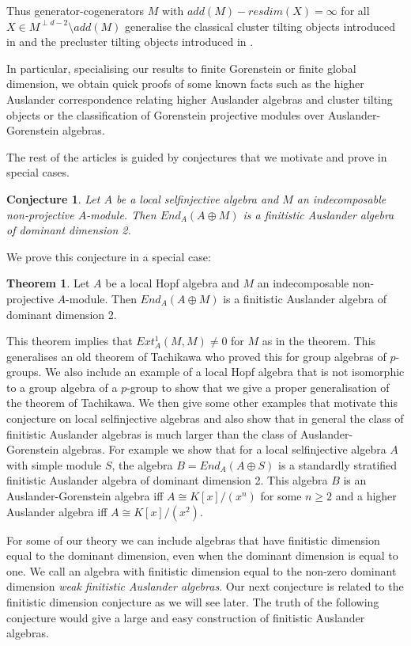 \documentclass[a4paper]{amsart}
\newtheorem*{conjecture}{Conjecture}
\theoremstyle{definition}
\newtheorem*{theorem*}{Theorem}
\theoremstyle{remark}
\numberwithin{equation}{theorem}
\begin{document}
Thus generator-cogenerators $M$ with $add(M)-resdim(X)= \infty$ for all $X \in M^{\perp d-2} \setminus add(M)$ generalise the classical cluster tilting objects introduced in \cite{Iya} and the precluster tilting objects introduced in \cite{IyaSol}.

In particular, specialising our results to finite Gorenstein or finite global dimension, we obtain quick proofs of some known facts such as the higher Auslander correspondence relating higher Auslander algebras and cluster tilting objects or the classification of Gorenstein projective modules over Auslander-Gorenstein algebras.

The rest of the articles is guided by conjectures that we motivate and prove in special cases.

\begin{conjecture} 
Let $A$ be a local selfinjective algebra and $M$ an indecomposable non-projective $A$-module.
Then $End_A(A \oplus M)$ is a finitistic Auslander algebra of dominant dimension 2.
\end{conjecture}

We prove this conjecture in a special case:
\begin{theorem*}
Let $A$ be a local Hopf algebra and $M$ an indecomposable non-projective $A$-module.
Then $End_A(A \oplus M)$ is a finitistic Auslander algebra of dominant dimension 2.
\end{theorem*}
This theorem implies that $Ext_A^1(M,M) \neq 0$ for $M$ as in the theorem. This generalises an old theorem of Tachikawa who proved this for group algebras of $p$-groups. We also include an example of a local Hopf algebra that is not isomorphic to a group algebra of a $p$-group to show that we give a proper generalisation of the theorem of Tachikawa.
We then give some other examples that motivate this conjecture on local selfinjective algebras and also show that in general the class of finitistic Auslander algebras is much larger than the class of Auslander-Gorenstein algebras. For example we show that for a local selfinjective algebra $A$ with simple module $S$, the algebra $B=End_A(A \oplus S)$ is a standardly stratified finitistic Auslander algebra of dominant dimension 2. This algebra $B$ is an Auslander-Gorenstein algebra iff $A \cong K[x]/(x^n)$ for some $n \geq 2$ and a higher Auslander algebra iff $A \cong K[x]/(x^2)$.

For some of our theory we can include algebras that have finitistic dimension equal to the dominant dimension, even when the dominant dimension is equal to one. We call an algebra with finitistic dimension equal to the non-zero dominant dimension \emph{weak finitistic Auslander algebras}.
Our next conjecture is related to the finitistic dimension conjecture as we will see later. The truth of the following conjecture would give a large and easy construction of finitistic Auslander algebras.
\end{document}

